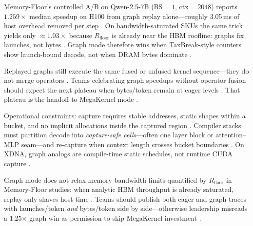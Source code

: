 Memory-Floor's controlled A/B on Qwen-2.5-7B (BS${=}1$, ctx${=}2048$) reports $1.259\times$ median speedup on H100 from graph replay alone---roughly 3.05\,ms of host overhead removed per step \citep{memoryfloor2026}. On bandwidth-saturated SKUs the same trick yields only ${\approx}1.03\times$ because $R_{\mathrm{floor}}$ is already near the HBM roofline: graphs fix launches, not bytes \citep{memoryfloor2026,semianalysis2024tma}. Graph mode therefore wins when TaxBreak-style counters show launch-bound decode, not when DRAM bytes dominate \citep{taxbreak2026}.

Replayed graphs still execute the same fused or unfused kernel sequence---they do not merge operators \citep{nvidia2024cudagraphs,memoryfloor2026,yirage2026}. Teams celebrating graph speedups without operator fusion should expect the next plateau when bytes/token remain at eager levels \citep{taxbreak2026,patel2025llminference,dao2022flashattention,chen2020compilerbasedhardw,amd2024xdna,amd2024aie,semianalysis2024tma,kwon2023vllm,liu2024deepseekv3,dlbook,dao2023flashdecoding,nvidia2022hopper,taxbreak2026,memoryfloor2026,nvidia2024cudagraphs,yirage2026}. That plateau is the handoff to MegaKernel mode \citep{yirage2026,chen2020compilerbasedhardw,patel2025llminference,taxbreak2026,memoryfloor2026,amd2024xdna,semianalysis2024tma,dao2022flashattention,kwon2023vllm,liu2024deepseekv3,dlbook,dao2023flashdecoding,nvidia2022hopper,nvidia2024cudagraphs,amd2024aie}.

Operational constraints: capture requires stable addresses, static shapes within a bucket, and no implicit allocations inside the captured region \citep{nvidia2024cudagraphs,kwon2023vllm}. Compiler stacks must partition decode into \emph{capture-safe cells}---often one layer block or attention--MLP seam---and re-capture when context length crosses bucket boundaries \citep{yirage2026,chen2020compilerbasedhardw}. On XDNA, graph analogs are compile-time static schedules, not runtime CUDA capture \citep{amd2024aie,amd2024xdna}.

Graph mode does not relax memory-bandwidth limits quantified by $R_{\mathrm{floor}}$ in Memory-Floor studies: when analytic HBM throughput is already saturated, replay only shaves host time \citep{memoryfloor2026,semianalysis2024tma,patel2025llminference}. Teams should publish both eager and graph traces with launches/token \emph{and} bytes/token side by side---otherwise leadership misreads a 1.25$\times$ graph win as permission to skip MegaKernel investment \citep{taxbreak2026,nvidia2024cudagraphs,yirage2026,amd2024xdna,dlbook,chen2020compilerbasedhardw,dao2022flashattention,kwon2023vllm,liu2024deepseekv3,dao2023flashdecoding}.

